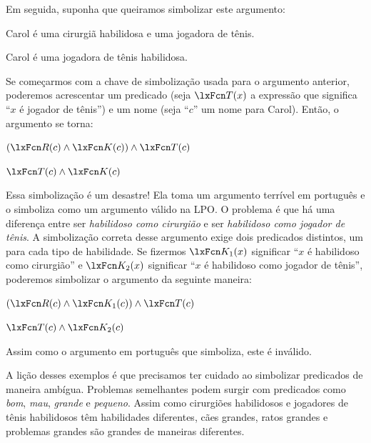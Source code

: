 Em seguida, suponha que queiramos simbolizar este argumento:
\begin{earg}
\label{surgeon3}
\item Carol é uma cirurgiã habilidosa e uma jogadora de tênis.
\item[\texttherefore] Carol é uma jogadora de tênis habilidosa.
\end{earg}
Se começarmos com a chave de simbolização usada para o argumento anterior, poderemos acrescentar um predicado (seja $\atom{T}{x}$ a expressão que significa \textquotedblleft $x$ é jogador de tênis\textquotedblright{}) e um nome (seja \textquotedblleft $c$\textquotedblright{} um nome para Carol). Então, o argumento se torna:
\begin{earg}
\item[] $(\atom{R}{c} \eand \atom{K}{c}) \eand \atom{T}{c}$
\item[\texttherefore] $\atom{T}{c} \eand \atom{K}{c}$
\end{earg}
Essa simbolização é um desastre! Ela toma um argumento terrível em português e o simboliza como um argumento válido na LPO. O problema é que há uma diferença entre ser \emph{habilidoso como cirurgião} e ser \emph{habilidoso como jogador de tênis}. A simbolização correta desse argumento exige dois predicados distintos, um para cada tipo de habilidade. Se fizermos $\atom{K_1}{x}$ significar \textquotedblleft $x$ é habilidoso como cirurgião\textquotedblright{} e $\atom{K_2}{x}$ significar \textquotedblleft $x$ é habilidoso como jogador de tênis\textquotedblright{}, poderemos simbolizar o argumento da seguinte maneira:
\begin{earg}
\label{surgeon3correct}
\item[] $(\atom{R}{c} \eand \atom{K_1}{c}) \eand \atom{T}{c}$
\item[\texttherefore] $\atom{T}{c} \eand \atom{K_2}{c}$
\end{earg}
Assim como o argumento em português que simboliza, este é inválido. %

A lição desses exemplos é que precisamos ter cuidado ao simbolizar predicados de maneira ambígua. Problemas semelhantes podem surgir com predicados como \emph{bom}, \emph{mau}, \emph{grande} e \emph{pequeno}. Assim como cirurgiões habilidosos e jogadores de tênis habilidosos têm habilidades diferentes, cães grandes, ratos grandes e problemas grandes são grandes de maneiras diferentes.

